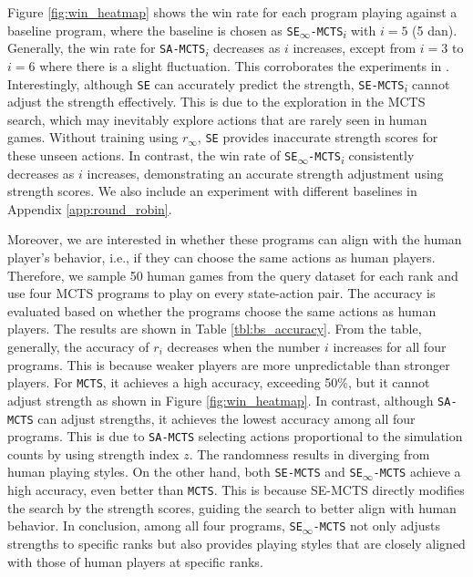 Figure \ref{fig:win_heatmap} shows the win rate for each program playing against a baseline program, where the baseline is chosen as \texttt{SE\textsubscript{$\infty$}-MCTS\textsubscript{$i$}} with $i=5$ (5 dan).
Generally, the win rate for \texttt{SA-MCTS\textsubscript{$i$}} decreases as $i$ increases, except from $i=3$ to $i=6$ where there is a slight fluctuation.
This corroborates the experiments in \citep{wu_strength_2019}.
Interestingly, although \texttt{SE} can accurately predict the strength, \texttt{SE-MCTS\textsubscript{$i$}} cannot adjust the strength effectively.
This is due to the exploration in the MCTS search, which may inevitably explore actions that are rarely seen in human games.
Without training using $r_\infty$, \texttt{SE} provides inaccurate strength scores for these unseen actions.
In contrast, the win rate of \texttt{SE\textsubscript{$\infty$}-MCTS\textsubscript{$i$}} consistently decreases as $i$ increases, demonstrating an accurate strength adjustment using strength scores.
We also include an experiment with different baselines in Appendix \ref{app:round_robin}.

Moreover, we are interested in whether these programs can align with the human player's behavior, i.e., if they can choose the same actions as human players.
Therefore, we sample 50 human games from the query dataset for each rank and use four MCTS programs to play on every state-action pair.
The accuracy is evaluated based on whether the programs choose the same actions as human players.
The results are shown in Table \ref{tbl:bs_accuracy}.
From the table, generally, the accuracy of $r_i$ decreases when the number $i$ increases for all four programs.
This is because weaker players are more unpredictable than stronger players.
For \texttt{MCTS}, it achieves a high accuracy, exceeding 50\%, but it cannot adjust strength as shown in Figure \ref{fig:win_heatmap}.
In contrast, although \texttt{SA-MCTS} can adjust strengths, it achieves the lowest accuracy among all four programs.
This is due to \texttt{SA-MCTS} selecting actions proportional to the simulation counts by using strength index $z$.
The randomness results in diverging from human playing styles.
On the other hand, both \texttt{SE-MCTS} and \texttt{SE\textsubscript{$\infty$}-MCTS} achieve a high accuracy, even better than \texttt{MCTS}.
This is because SE-MCTS directly modifies the search by the strength scores, guiding the search to better align with human behavior. 
In conclusion, among all four programs, \texttt{SE\textsubscript{$\infty$}-MCTS} not only adjusts strengths to specific ranks but also provides playing styles that are closely aligned with those of human players at specific ranks.


